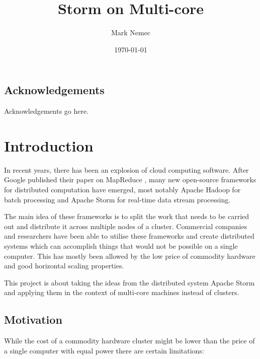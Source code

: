 \documentclass[bsc,logo,frontabs,twoside,singlespacing,normalheadings,parskip]{infthesis}\usepackage[]{graphicx}\usepackage[]{color}
\begin{document}
\title{Storm on Multi-core}
\author{Mark Nemec}

\date{\today}


\maketitle

\section*{Acknowledgements}
Acknowledgements go here.

\tableofcontents
\listoffigures
\listoftables
\listoflistings




\clearpage{}\chapter{Introduction}

In recent years, there has been an explosion of cloud computing software. After Google published their paper on MapReduce \cite{Anonymous:Jj3E6x7v}, many new open-source frameworks for distributed computation have emerged, most notably Apache Hadoop for batch processing and Apache Storm for real-time data stream processing.

The main idea of these frameworks is to split the work that needs to be carried out and distribute it across multiple nodes of a cluster. Commercial companies and researchers have been able to utilise these frameworks and create distributed systems \cite{5billion-sessions} which can accomplish things that would not be possible on a single computer. This has mostly been allowed by the low price of commodity hardware and good horizontal scaling properties.

This project is about taking the ideas from the distributed system Apache Storm and applying them in the context of multi-core machines instead of clusters.

\section{Motivation}

While the cost of a commodity hardware cluster might be lower than the price of a single computer with equal power there are certain limitations:
\end{document}
